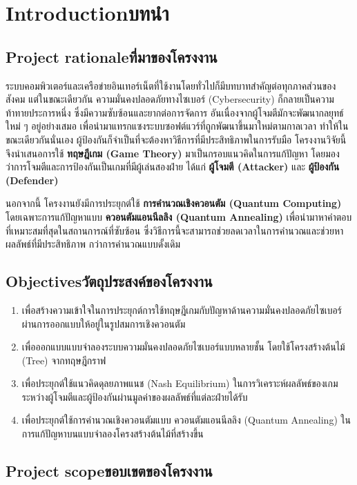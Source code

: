 \chapter{\ifenglish Introduction\else บทนำ\fi}

\section{\ifenglish Project rationale\else ที่มาของโครงงาน\fi}
ระบบคอมพิวเตอร์และเครือข่ายอินเทอร์เน็ตที่ใช้งานโดยทั่วไปก็มีบทบาทสำคัญต่อทุกภาคส่วนของสังคม 
แต่ในขณะเดียวกัน ความมั่นคงปลอดภัยทางไซเบอร์ (Cybersecurity) ก็กลายเป็นความท้าทายประการหนึ่ง 
ซึ่งมีความซับซ้อนและยากต่อการจัดการ อันเนื่องจากผู้โจมตีมักจะพัฒนากลยุทธ์ใหม่ ๆ อยู่อย่างเสมอ 
เพื่อนำมาแทรกแซงระบบซอฟต์แวร์ที่ถูกพัฒนาขึ้นมาใหม่ตามกาลเวลา 
ทำให้ในขณะเดียวกันนั่นเอง ผู้ป้องกันก็จำเป็นที่จะต้องหาวิธีการที่มีประสิทธิภาพในการรับมือ โครงงานวิจัยนี้จึงนำเสนอการใช้ \textbf{ทฤษฎีเกม (Game Theory)} 
มาเป็นกรอบแนวคิดในการแก้ปัญหา โดยมองว่าการโจมตีและการป้องกันเป็นเกมที่มีผู้เล่นสองฝ่าย ได้แก่ 
\textbf{ผู้โจมตี (Attacker)} และ \textbf{ผู้ป้องกัน (Defender)}  

นอกจากนี้ โครงงานยังมีการประยุกต์ใช้ \textbf{การคำนวณเชิงควอนตัม (Quantum Computing)} 
โดยเฉพาะการแก้ปัญหาแบบ \textbf{ควอนตัมแอนนีลลิง (Quantum Annealing)} 
เพื่อนำมาหาคำตอบที่เหมาะสมที่สุดในสถานการณ์ที่ซับซ้อน 
ซึ่งวิธีการนี้จะสามารถช่วยลดเวลาในการคำนวณและช่วยหาผลลัพธ์ที่มีประสิทธิภาพ 
กว่าการคำนวณแบบดั้งเดิม  
\section{\ifenglish Objectives\else วัตถุประสงค์ของโครงงาน\fi}
\begin{enumerate}
        \item เพื่อสร้างความเข้าใจในการประยุกต์การใช้ทฤษฎีเกมกับปัญหาด้านความมั่นคงปลอดภัยไซเบอร์ ผ่านการออกแบบให้อยู่ในรูปสมการเชิงควอนตัม
        \item เพื่อออกแบบแบบจำลองระบบความมั่นคงปลอดภัยไซเบอร์แบบหลายชั้น โดยใช้โครงสร้างต้นไม้ (Tree) จากทฤษฎีกราฟ
        \item เพื่อประยุกต์ใช้แนวคิดดุลยภาพแนช (Nash Equilibrium) ในการวิเคราะห์ผลลัพธ์ของเกมระหว่างผู้โจมตีและผู้ป้องกันผ่านมูลค่าของผลลัพธ์ที่แต่ละฝ่ายได้รับ
        \item เพื่อประยุกต์ใช้การคำนวณเชิงควอนตัมแบบ ควอนตัมแอนนีลลิง (Quantum Annealing) ในการแก้ปัญหาบนแบบจำลองโครงสร้างต้นไม้ที่สร้างขึ้น
\end{enumerate}

\section{\ifenglish Project scope\else ขอบเขตของโครงงาน\fi}

